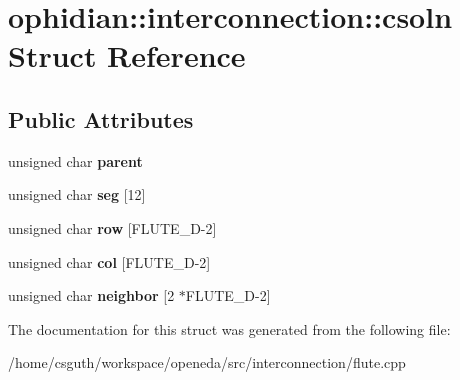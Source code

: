 \hypertarget{structophidian_1_1interconnection_1_1csoln}{\section{ophidian\-:\-:interconnection\-:\-:csoln Struct Reference}
\label{structophidian_1_1interconnection_1_1csoln}
}
\subsection*{Public Attributes}
\begin{DoxyCompactItemize}
\item 
\hypertarget{structophidian_1_1interconnection_1_1csoln_a018023339abcda04061237c4edd154bb}{unsigned char {\bfseries parent}}\label{structophidian_1_1interconnection_1_1csoln_a018023339abcda04061237c4edd154bb}

\item 
\hypertarget{structophidian_1_1interconnection_1_1csoln_a97d481e5d83ba97bd63ce1536ecbea7d}{unsigned char {\bfseries seg} \mbox{[}12\mbox{]}}\label{structophidian_1_1interconnection_1_1csoln_a97d481e5d83ba97bd63ce1536ecbea7d}

\item 
\hypertarget{structophidian_1_1interconnection_1_1csoln_aa6b0adf958ad9134858b6f34e8300ee4}{unsigned char {\bfseries row} \mbox{[}F\-L\-U\-T\-E\-\_\-\-D-\/2\mbox{]}}\label{structophidian_1_1interconnection_1_1csoln_aa6b0adf958ad9134858b6f34e8300ee4}

\item 
\hypertarget{structophidian_1_1interconnection_1_1csoln_a096d47c00ce69d45b19253061ac92ed7}{unsigned char {\bfseries col} \mbox{[}F\-L\-U\-T\-E\-\_\-\-D-\/2\mbox{]}}\label{structophidian_1_1interconnection_1_1csoln_a096d47c00ce69d45b19253061ac92ed7}

\item 
\hypertarget{structophidian_1_1interconnection_1_1csoln_ac30c24099e70c390811c1031a7bc7790}{unsigned char {\bfseries neighbor} \mbox{[}2 $\ast$F\-L\-U\-T\-E\-\_\-\-D-\/2\mbox{]}}\label{structophidian_1_1interconnection_1_1csoln_ac30c24099e70c390811c1031a7bc7790}

\end{DoxyCompactItemize}


The documentation for this struct was generated from the following file\-:\begin{DoxyCompactItemize}
\item 
/home/csguth/workspace/openeda/src/interconnection/flute.\-cpp\end{DoxyCompactItemize}
